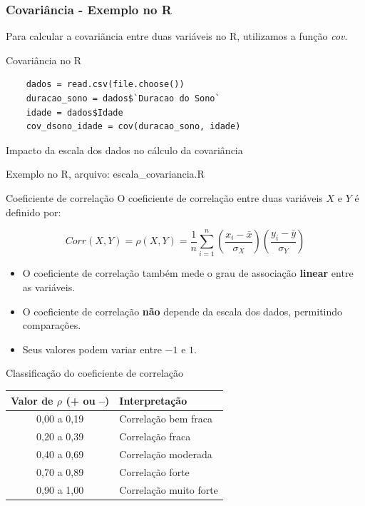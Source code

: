 \begin{frame}[fragile]
    \frametitle{Covariância - Exemplo no R}   
    Para calcular a covariãncia entre duas variáveis no R, utilizamos a função \textit{cov}.
    \begin{block}{Covariância no R}
    \begin{verbatim}
    dados = read.csv(file.choose())
    duracao_sono = dados$`Duracao do Sono`
    idade = dados$Idade
    cov_dsono_idade = cov(duracao_sono, idade)
    \end{verbatim}
    \end{block}
\end{frame}

\begin{frame}{Impacto da escala dos dados no cálculo da covariância}
    \begin{itemize}
        Exemplo no R, arquivo: escala\_covariancia.R 
    \end{itemize}
\end{frame}

\begin{frame}{Coeficiente de correlação}
    O coeficiente de correlação entre duas variáveis $X$ e $Y$ é definido por:

    $$Corr(X,Y) = \rho(X,Y) = \dfrac{1}{n} \sum_{i=1}^n \left( \dfrac{x_i - \bar{x}}{\sigma_X}\right) \left( \dfrac{y_i - \bar{y}}{\sigma_Y}\right)$$

    \pause
    \begin{itemize}
        \item O coeficiente de correlação também mede o grau de associação \textbf{linear} entre as variáveis.
        \pause
        \item  O coeficiente de correlação \textbf{não} depende da escala dos dados, permitindo comparações. 
        \pause
        \item Seus valores podem variar entre $-1$ e $1$.
    \end{itemize}
\end{frame}

\begin{frame}{Classificação do coeficiente de correlação}
    
\begin{table}[H]
\centering
\begin{tabular}{|c|l|}
\hline
\textbf{Valor de $\rho$ (+ ou –)} & \textbf{Interpretação} \\ \hline
0{,}00 a 0{,}19 &  Correlação bem fraca \\ \hline
0{,}20 a 0{,}39 &  Correlação fraca \\ \hline
0{,}40 a 0{,}69 &  Correlação moderada \\ \hline
0{,}70 a 0{,}89 &  Correlação forte \\ \hline
0{,}90 a 1{,}00 &  Correlação muito forte \\ \hline
\end{tabular}
\end{table}
\end{frame}


